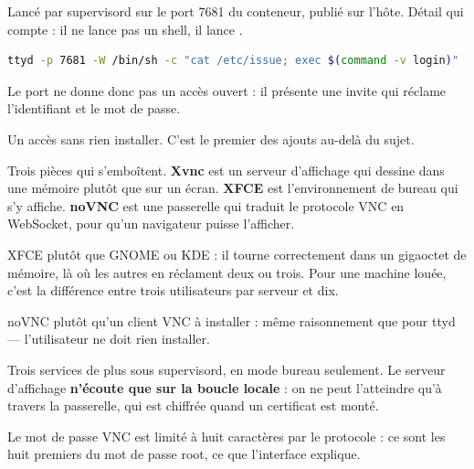 \role
Lancé par supervisord sur le port 7681 du conteneur, publié sur l'hôte. Détail
qui compte : il ne lance pas un shell, il lance .

\begin{lstlisting}[language=bash]
ttyd -p 7681 -W /bin/sh -c "cat /etc/issue; exec $(command -v login)"
\end{lstlisting}

Le port ne donne donc pas un accès ouvert : il présente une invite qui réclame
l'identifiant et le mot de passe.



\apport
Un accès sans rien installer. C'est le premier des ajouts au-delà du sujet.


\quoi
Trois pièces qui s'emboîtent. \textbf{Xvnc} est un serveur d'affichage qui
dessine dans une mémoire plutôt que sur un écran. \textbf{XFCE} est
l'environnement de bureau qui s'y affiche. \textbf{noVNC} est une passerelle qui
traduit le protocole VNC en WebSocket, pour qu'un navigateur puisse l'afficher.

\pourquoi
XFCE plutôt que GNOME ou KDE : il tourne correctement dans un gigaoctet de
mémoire, là où les autres en réclament deux ou trois. Pour une machine louée,
c'est la différence entre trois utilisateurs par serveur et dix.

noVNC plutôt qu'un client VNC à installer : même raisonnement que pour ttyd ---
l'utilisateur ne doit rien installer.

\role
Trois services de plus sous supervisord, en mode bureau seulement. Le serveur
d'affichage \textbf{n'écoute que sur la boucle locale} : on ne peut l'atteindre
qu'à travers la passerelle, qui est chiffrée quand un certificat est monté.

Le mot de passe VNC est limité à huit caractères par le protocole : ce sont les
huit premiers du mot de passe root, ce que l'interface explique.


